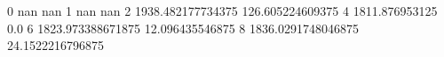 0 nan nan
1 nan nan
2 1938.482177734375 126.605224609375
4 1811.876953125 0.0
6 1823.973388671875 12.096435546875
8 1836.0291748046875 24.1522216796875
